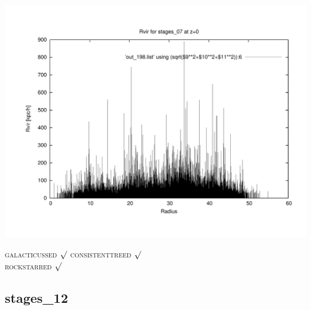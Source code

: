 \includegraphics[scale=0.3]{stages_07/plot_rvir_z0.pdf}



\textsc{galacticussed} $\surd$
\textsc{consistenttreed} $\surd$ \\ 
\textsc{rockstarred} $\surd$
 
% 
%
%
%
%
%
%
%

\newpage
\subsection{stages\_12}

